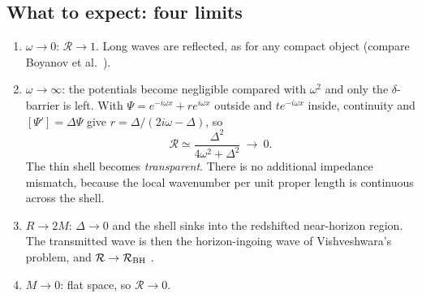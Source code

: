 \documentclass[11pt,a4paper]{article}
\numberwithin{equation}{section}
\newcommand{\RR}{\mathcal R}
\begin{document}
\subsection{What to expect: four limits}
\begin{enumerate}
\item $\omega\to0$: $\RR\to1$. Long waves are reflected, as for any compact object (compare Boyanov et al.\ \cite{Boyanov25}).
\item $\omega\to\infty$: the potentials become negligible compared with $\omega^2$ and only the $\delta$-barrier is left.
With $\Psi=e^{-i\omega x}+re^{i\omega x}$ outside and $te^{-i\omega x}$ inside, continuity and $[\Psi']=\Delta\Psi$ give
$r=\Delta/(2i\omega-\Delta)$, so
\begin{equation}
\RR\simeq\frac{\Delta^2}{4\omega^2+\Delta^2}\ \longrightarrow\ 0 .
\label{eq:deltalaw}
\end{equation}
The thin shell becomes \emph{transparent}. There is no additional impedance mismatch, because the local wavenumber per
unit proper length is continuous across the shell.
\item $R\to2M$: $\Delta\to0$ and the shell sinks into the redshifted near-horizon region. The transmitted wave is then
the horizon-ingoing wave of Vishveshwara's problem, and $\RR\to\RR_{\rm BH}$ \cite{Vishveshwara70}.
\item $M\to0$: flat space, so $\RR\to0$.
\end{enumerate}
\end{document}
